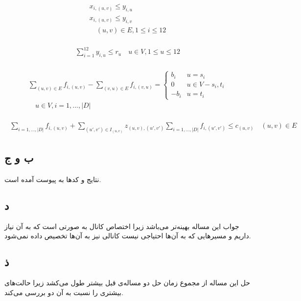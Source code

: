 \documentclass[paper=a4, fontsize=11pt]{article}
\numberwithin{equation}{section} %
\numberwithin{figure}{section} %
\numberwithin{table}{section} %
\begin{document}
\begin{align}
\begin{split}
	x_{i,(u,v)} \le y_{i,u}\\
	x_{i,(u,v)} \le y_{i,v}\\
	\quad (u,v) \in E, 1 \le i \le 12
\end{split}
\end{align}

\begin{align}
\begin{split}
	\sum_{i=1}^{12} y_{i,u} \le r_u
	\quad u \in V, 1 \le u \le 12
\end{split}
\end{align}

\begin{align}
\begin{split}
	\sum_{(u,v) \in E} f_{i,(u,v)} - \sum_{(v,u) \in E} f_{i,(v,u)} = 
	\left \{
		\begin{array}{cc}
			b_i & u = s_i\\
			0 & u \in V - {s_i, t_i}\\
			-b_i & u = t_i
		\end{array}
	\right.
	\\
	\quad u \in V, i = {1, ..., |D|}
\end{split}
\end{align}

\begin{align}
\begin{split}
	\sum_{i = {1, ..., |D|}} f_{i,(u,v)} + \sum_{(u',v') \in I_{(u,v)}} z_{(u,v),(u',v')} \sum_{i = {1, ..., |D|}} f_{i,(u',v')} \le c_{(u,v)}
	\quad (u,v) \in E
\end{split}
\end{align}

\subsection{ب و ج}
\paragraph{}
نتایج و کدها به پیوست آمده است.

\subsection{د}
جواب این مساله بهینه‌تر می‌باشد زیرا اختصاص کانال به صورتی است که به آن نیاز داریم و
مسیرهایی که به آن‌ها احتیاجی نیست کانالی نیز به آن‌ها تخصیص داده نمی‌شود.

\subsection{ذ}
حل این مساله از مجموع زمان حل دو مساله‌ی قبل بیشتر طول می‌کشد زیرا حالت‌های بیشتری را نسبت به آن دو بررسی می‌کند.
\end{document}
